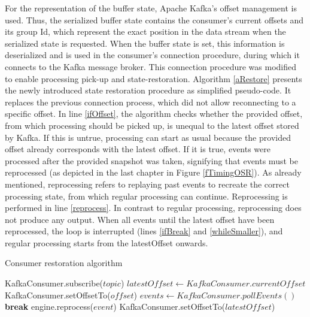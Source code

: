 For the representation of the buffer state, Apache Kafka's offset management is used. Thus, the serialized buffer state contains the consumer's current offsets and its group Id, which represent the exact position in the data stream when the serialized state is requested. When the buffer state is set, this information is deserialized and is used in the consumer's connection procedure, during which it connects to the Kafka message broker. This connection procedure was modified to enable processing pick-up and state-restoration. Algorithm \ref{aRestore} presents the newly introduced state restoration procedure as simplified pseudo-code. It replaces the previous connection process, which did not allow reconnecting to a specific offset. In line \ref{ifOffset}, the algorithm checks whether the provided offset, from which processing should be picked up, is unequal to the latest offset stored by Kafka. If this is untrue, processing can start as usual because the provided offset already corresponds with the latest offset. If it is true, events were processed after the provided snapshot was taken, signifying that events must be reprocessed (as depicted in the last chapter in Figure \ref{fTimingOSR}). As already mentioned, reprocessing refers to replaying past events to recreate the correct processing state, from which regular processing can continue. Reprocessing is performed in line \ref{reprocess}. In contrast to regular processing, reprocessing does not produce any output. When all events until the latest offset have been reprocessed, the loop is interrupted (lines \ref{ifBreak} and \ref{whileSmaller}), and regular processing starts from the latestOffset onwards.\par


\begin{algorithm}[H]
\caption{Consumer restoration algorithm}\label{aRestore}
\begin{algorithmic}[1]
\State KafkaConsumer.subscribe($topic$)
\State $latestOffset \gets KafkaConsumer.currentOffset$
\label{ifOffset}
    \State KafkaConsumer.setOffsetTo($offset$)
    \label{whileSmaller}
        \State $events \gets KafkaConsumer.pollEvents()$
            \label{ifBreak}
                \State \textbf{break}
            \EndIf
            \State engine.reprocess($event$)\label{reprocess}
        \EndFor
    \EndWhile\label{restoreendwhile}
    \State KafkaConsumer.setOffsetTo($latestOffset$)
\EndIf\label{restoreendif}
\EndProcedure
\end{algorithmic}
\end{algorithm}






